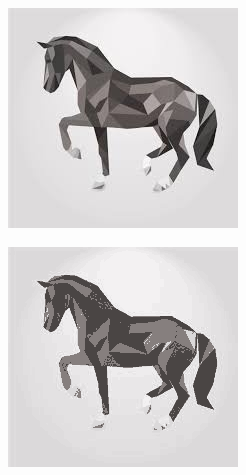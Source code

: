 \begin{figure}[htbp]
    \centering
    \caption{
        Case study: \texttt{horse-137.jpg}, $k=10$.
        Original image, reconstructed image using k-means, reconstruction error,
        and clusterings in sample space.
    }
    \begin{subfigure}[t]{0.32\textwidth}
        \includegraphics[width=\linewidth]{../../rust_code/data/kmeans/horse-137.jpg}
    \end{subfigure}
    \begin{subfigure}[t]{0.32\textwidth}
        \includegraphics[width=\linewidth]{../../python_code/plots/kmeans/horse-137/reconstruction.png}

\end{subfigure}
\end{figure}
